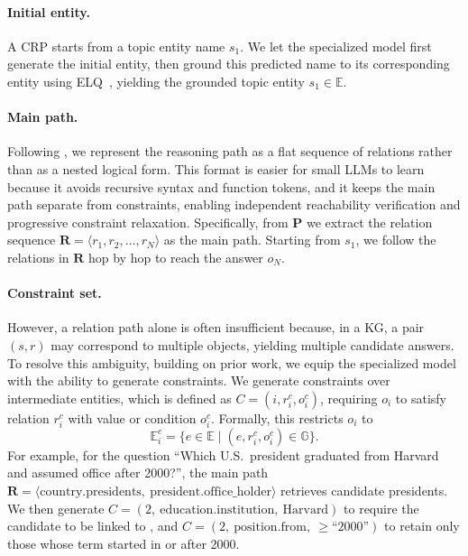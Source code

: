 \documentclass[11pt]{article}
\begin{document}
\paragraph{Initial entity.}
A CRP starts from a topic entity name $s_1$. We let the specialized model first generate the initial entity, then ground this predicted name to its corresponding entity using ELQ~\citep{li2020efficient}, yielding the grounded topic entity $s_1 \in \mathbb{E}$.

\paragraph{Main path.}
Following \citet{luo2024rog}, we represent the reasoning path as a flat sequence of relations rather than as a nested logical form. This format is easier for small LLMs to learn because it avoids recursive syntax and function tokens, and it keeps the main path separate from constraints, enabling independent reachability verification and progressive constraint relaxation. Specifically, from $\mathbf{P}$ we extract the relation sequence $\mathbf{R}=\langle r_1,r_2,\ldots,r_N\rangle$ as the main path. Starting from $s_1$, we follow the relations in $\mathbf{R}$ hop by hop to reach the answer $o_N$.

\paragraph{Constraint set.}
However, a relation path alone is often insufficient because, in a KG, a pair $(s,r)$ may correspond to multiple objects, yielding multiple candidate answers. To resolve this ambiguity, building on prior work, we equip the specialized model with the ability to generate constraints. We generate constraints over intermediate entities, which is defined as $C=(i,r_i^c,o_i^c)$, requiring $o_i$ to satisfy relation $r_i^c$ with value or condition $o_i^c$. Formally, this restricts $o_i$ to
\begin{equation}
\mathbb{E}_i^c=\{e\in\mathbb{E}\mid (e,r_i^c,o_i^c)\in\mathbb{G}\}.
\end{equation}
For example, for the question ``Which U.S.\ president graduated from Harvard and assumed office after 2000?'', the main path $\mathbf{R}=\langle\text{country.presidents},\ \text{president.office\_holder}\rangle$ retrieves candidate presidents. We then generate $C=(2,\ \text{education.institution},\ \text{Harvard})$ to require the candidate to be linked to , and $C=(2,\ \text{position.from},\ {\geq}\text{``2000''})$ to retain only those whose term started in or after 2000.
\end{document}
